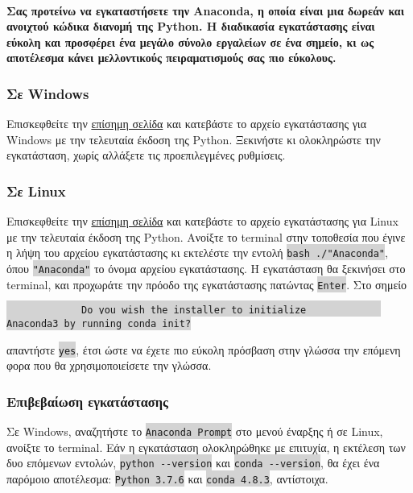 \documentclass[a4paper,10pt]{report}
\begin{document}
\paragraph{
    Σας προτείνω να εγκαταστήσετε την Anaconda, η οποία είναι μια δωρεάν
    και ανοιχτού κώδικα διανομή της Python. Η διαδικασία εγκατάστασης είναι
    εύκολη και προσφέρει ένα μεγάλο σύνολο εργαλείων σε ένα σημείο, κι ως
    αποτέλεσμα κάνει μελλοντικούς πειραματισμούς σας πιο εύκολους.
}
\subsubsection{Σε Windows}
Επισκεφθείτε την \href{https://tinyurl.com/yc39u67t}{επίσημη σελίδα}
και κατεβάστε το αρχείο εγκατάστασης για Windows με την τελευταία έκδοση της
Python. Ξεκινήστε κι ολοκληρώστε την εγκατάσταση, χωρίς αλλάξετε τις
προεπιλεγμένες ρυθμίσεις.
\subsubsection{Σε Linux}
Επισκεφθείτε την \href{https://tinyurl.com/yc39u67t}{επίσημη σελίδα}
και κατεβάστε το αρχείο εγκατάστασης για Linux με την τελευταία έκδοση της
Python. Ανοίξτε το terminal στην τοποθεσία που έγινε η λήψη του αρχείου
εγκατάστασης κι εκτελέστε την εντολή
\colorbox{lightgray}{\lstinline{bash ./"Anaconda"}}, όπου
\colorbox{lightgray}{\lstinline{"Anaconda"}} το όνομα αρχείου εγκατάστασης.
Η εγκατάσταση θα ξεκινήσει στο terminal, και προχωράτε την πρόοδο της
εγκατάστασης πατώντας \colorbox{lightgray}{\lstinline{Enter}}. Στο σημείο
\begin{center}
    \colorbox{lightgray}{\lstinline{
            Do you wish the installer to initialize
            Anaconda3 by running conda init?}}
\end{center}
απαντήστε \colorbox{lightgray}{\lstinline{yes}}, έτσι ώστε να έχετε πιο
εύκολη πρόσβαση στην γλώσσα την επόμενη φορα που θα χρησιμοποιείσετε την
γλώσσα.
\subsubsection{Επιβεβαίωση εγκατάστασης}
Σε Windows, αναζητήστε το \colorbox{lightgray}{\lstinline{Anaconda Prompt}}
στο μενού έναρξης ή σε Linux, ανοίξτε το terminal.
Εάν η εγκατάσταση ολοκληρώθηκε με επιτυχία, η εκτέλεση των δυο επόμενων
εντολών, \colorbox{lightgray}{\lstinline{python --version}} και
\colorbox{lightgray}{\lstinline{conda --version}}, θα έχει ένα παρόμοιο
αποτέλεσμα: \colorbox{lightgray}{\lstinline{Python 3.7.6}} και
\colorbox{lightgray}{\lstinline{conda 4.8.3}}, αντίστοιχα.
\end{document}
